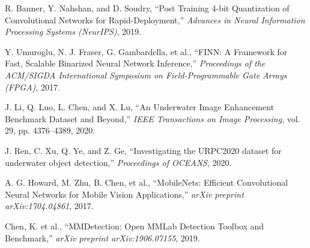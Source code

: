 \begin{enumerate}
 R. Banner, Y. Nahshan, and D. Soudry,
``Post Training 4-bit Quantization of Convolutional Networks for Rapid-Deployment,''
\textit{Advances in Neural Information Processing Systems (NeurIPS)}, 2019.

 Y. Umuroglu, N. J. Fraser, G. Gambardella, et al.,
``FINN: A Framework for Fast, Scalable Binarized Neural Network Inference,''
\textit{Proceedings of the ACM/SIGDA International Symposium on Field-Programmable Gate Arrays (FPGA)}, 2017.

 J. Li, Q. Luo, L. Chen, and X. Lu,
``An Underwater Image Enhancement Benchmark Dataset and Beyond,''
\textit{IEEE Transactions on Image Processing}, vol. 29, pp. 4376--4389, 2020.

 J. Ren, C. Xu, Q. Ye, and Z. Ge,
``Investigating the URPC2020 dataset for underwater object detection,''
\textit{Proceedings of OCEANS}, 2020.

 A. G. Howard, M. Zhu, B. Chen, et al.,
``MobileNets: Efficient Convolutional Neural Networks for Mobile Vision Applications,''
\textit{arXiv preprint arXiv:1704.04861}, 2017.

 Chen, K. et al.,
``MMDetection: Open MMLab Detection Toolbox and Benchmark,''
\textit{arXiv preprint arXiv:1906.07155}, 2019.

\end{enumerate}
